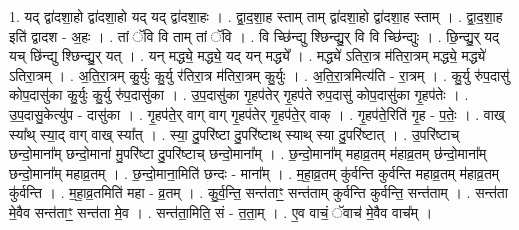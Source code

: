 \documentclass[17pt]{extarticle}
\begin{document}
1. यद् द्वा॑दशा॒हो द्वा॑दशा॒हो यद् यद् द्वा॑दशा॒हः । . द्वा॒द॒शा॒ह स्ताम् ताम् द्वा॑दशा॒हो द्वा॑दशा॒ह स्ताम् । . द्वा॒द॒शा॒ह इति॑ द्वादश - अ॒हः । . तां ॅवि वि ताम् तां ॅवि । . वि च्छि॑न्द्यु श्छिन्द्यु॒र् वि वि च्छि॑न्द्युः । . छि॒न्द्यु॒र् यद् यच् छि॑न्द्यु श्छिन्द्यु॒र् यत् । . यन् मद्ध्ये॒ मद्ध्ये॒ यद् यन् मद्ध्ये᳚ । . मद्ध्ये॑ ऽतिरा॒त्र म॑तिरा॒त्रम् मद्ध्ये॒ मद्ध्ये॑ ऽतिरा॒त्रम् । . अ॒ति॒रा॒त्रम् कु॒र्युः कु॒र्यु र॑तिरा॒त्र म॑तिरा॒त्रम् कु॒र्युः । . अ॒ति॒रा॒त्रमित्य॑ति - रा॒त्रम् । . कु॒र्यु रु॑प॒दासु॑ कोप॒दासु॑का कु॒र्युः कु॒र्यु रु॑प॒दासु॑का । . उ॒प॒दासु॑का गृ॒हप॑तेर् गृ॒हप॑ते रुप॒दासु॑ कोप॒दासु॑का गृ॒हप॑तेः । . उ॒प॒दासु॒केत्यु॑प - दासु॑का । . गृ॒हप॑ते॒र् वाग् वाग् गृ॒हप॑तेर् गृ॒हप॑ते॒र् वाक् । . गृ॒हप॑ते॒रिति॑ गृ॒ह - प॒तेः॒ । . वाख् स्या᳚थ् स्या॒द् वाग् वाख् स्या᳚त् । . स्या॒ दु॒परि॑ष्टा दु॒परि॑ष्टाथ् स्याथ् स्या दु॒परि॑ष्टात् । . उ॒परि॑ष्टाच् छन्दो॒माना᳚म् छन्दो॒माना॑ मु॒परि॑ष्टा दु॒परि॑ष्टाच् छन्दो॒माना᳚म् । . छ॒न्दो॒माना᳚म् महाव्र॒तम् म॑हाव्र॒तम् छ॑न्दो॒माना᳚म् छन्दो॒माना᳚म् महाव्र॒तम् । . छ॒न्दो॒माना॒मिति॑ छन्दः - माना᳚म् । . म॒हा॒व्र॒तम् कु॑र्वन्ति कुर्वन्ति महाव्र॒तम् म॑हाव्र॒तम् कु॑र्वन्ति । . म॒हा॒व्र॒तमिति॑ महा - व्र॒तम् । . कु॒र्व॒न्ति॒ सन्त॑ताꣳ॒॒ सन्त॑ताम् कुर्वन्ति कुर्वन्ति॒ सन्त॑ताम् । . सन्त॑ता मे॒वैव सन्त॑ताꣳ॒॒ सन्त॑ता मे॒व । . सन्त॑ता॒मिति॒ सं - त॒ता॒म् । . ए॒व वाचं॒ ॅवाच॑ मे॒वैव वाच᳚म् । \newline
\end{document}
